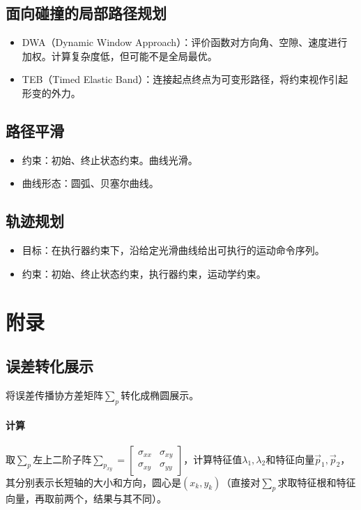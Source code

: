 \documentclass[
12pt, %
a4paper, 
oneside, %
headinclude,footinclude, %
]{scrartcl}
\begin{document}
\subsection[面向碰撞的局部路径规划]{面向碰撞的局部路径规划}
\begin{itemize}
\item DWA（Dynamic Window Approach）：评价函数对方向角、空隙、速度进行加权。计算复杂度低，但可能不是全局最优。
\item TEB（Timed Elastic Band）：连接起点终点为可变形路径，将约束视作引起形变的外力。
\end{itemize}
\subsection[路径平滑]{路径平滑}
\begin{itemize}
\item 约束：初始、终止状态约束。曲线光滑。
\item 曲线形态：圆弧、贝塞尔曲线。
\end{itemize}
\subsection[轨迹规划]{轨迹规划}
\begin{itemize}
\item 目标：在执行器约束下，沿给定光滑曲线给出可执行的运动命令序列。
\item 约束：初始、终止状态约束，执行器约束，运动学约束。
\end{itemize}
\section{附录}
\subsection[误差转化展示]{误差转化展示}\label{sec:error}
将误差传播协方差矩阵$ \sum_p $转化成椭圆展示。
\paragraph{计算}
取$ \sum_p $左上二阶子阵$ \sum_{p_{xy}} = \begin{bmatrix} \sigma_{xx} & \sigma_{xy} \\ \sigma_{xy} & \sigma_{yy} \end{bmatrix} $，计算特征值$ \lambda_1,\lambda_2 $和特征向量$ \overrightarrow{p}_1,\overrightarrow{p}_2 $，其分别表示长短轴的大小和方向，圆心是$ (x_k, y_k) $（直接对$ \sum_p $求取特征根和特征向量，再取前两个，结果与其不同）。
\end{document}
